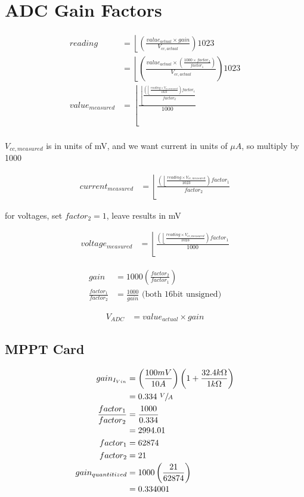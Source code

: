 \documentclass[11pt]{article} %
\begin{document}
\section{ADC Gain Factors}

\begin{align*}
reading &= \left\lfloor \left(\frac{value_{actual} \times gain}{V_{cc,actual}}\right) 1023 \right. \\ 
&= \left\lfloor \left(\frac{value_{actual} \times \left(\frac{1000 \times factor_2}{factor_1}\right)}{V_{cc,actual}}\right)1023 \right. \\
value_{measured} &= \left\lfloor\frac{\left\lfloor \frac{\left(\left\lfloor\frac{reading \times V_{cc,measured}}{1023}\right.\right)factor_1}{factor_2}\right.}{1000} \right. \\
\end{align*}

\(V_{cc,measured}\) is in units of mV, and we want current in units of \(\mu A\), so multiply by 1000

\begin{align*}
current_{measured} &= \left\lfloor \frac{\left(\left\lfloor\frac{reading \times V_{cc,measured}}{1023}\right.\right)factor_1}{factor_2}\right.
\end{align*}

for voltages, set \(factor_2 = 1\), leave results in mV

\begin{align*}
voltage_{measured} &= \left\lfloor\frac{\left(\left\lfloor\frac{reading \times V_{cc, measured}}{1023}\right.\right)factor_1}{1000}\right. \tag{2}
\end{align*}

\begin{align*}
gain &= 1000\left(\frac{factor_2}{factor_1}\right) \\
\frac{factor_1}{factor_2} &= \frac{1000}{gain} \text{ (both 16bit unsigned)} \tag{3}
\end{align*}

\begin{align*}
V_{ADC} &= value_{actual} \times gain \tag{4}
\end{align*}



\subsection{MPPT Card}

\begin{align*}
gain_{I_{Vin}} &= \left(\frac{100mV}{10A}\right) \left(1 + \frac{32.4k\Omega}{1k\Omega}\right) \\
&= 0.334~\sfrac{V}{A} \\
\frac{factor_1}{factor_2} &= \frac{1000}{0.334} \\
&= 2994.01
\\
factor_1 &= 62874 \\
factor_2 &= 21 \\
gain_{quantitized} &= 1000 \left(\frac{21}{62874}\right) \\
&= 0.334001
\end{align*}
\end{document}
